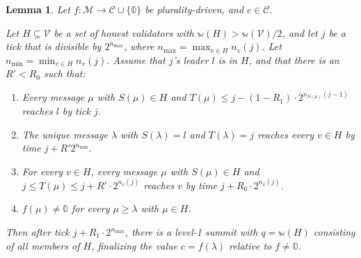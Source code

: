 \documentclass[12pt, fleqn]{article}
\newtheorem{lemma}{Lemma}
\newcommand{\ww}{\mathbb{w}}
\begin{document}
\begin{lemma}\label{basicLiveness}
  Let $f : \mathcal{M} \rightarrow \mathcal{C} \cup \{ \mathbb{0} \}$ be plurality-driven, and $c \in \mathcal{C}$.

  Let $H \subseteq \mathcal{V}$ be a set of honest validators with $\ww(H) > \ww(\mathcal{V}) / 2$, and let $j$ be a tick that is divisible by $2^{n_{\max}}$, where $n_{\max} = \max_{v \in H} n_v(j)$. Let $n_{\min} = \min_{v \in H} n_v(j)$. Assume that $j$'s leader $l$ is in $H$, and that there is an $R' < R_0$ such that:
  \begin{enumerate}
    \item Every message $\mu$ with $S(\mu) \in H$ and $T(\mu) \leq j - (1 - R_1) \cdot 2^{n_{S(\mu)}(j - 1)}$ reaches $l$ by tick $j$.
    \item The unique message $\lambda$ with $S(\lambda) = l$ and $T(\lambda) = j$ reaches every $v \in H$ by time $j + R' 2^{n_{\min}}$.
    \item For every $v \in H$, every message $\mu$ with $S(\mu) \in H$ and $j \leq T(\mu) \leq j + R' \cdot 2^{n_v(j)}$ reaches $v$ by time $j + R_0 \cdot 2^{n_v(j)}$.
    \item $f(\mu) \neq \mathbb{0}$ for every $\mu \geq \lambda$ with $\mu \in H$.
  \end{enumerate}
  Then after tick $j + R_1 \cdot 2^{n_{\max}}$, there is a level-1 summit with $q = \ww(H)$ consisting of all members of $H$, finalizing the value $c = f(\lambda)$ relative to $f \neq \mathbb{0}$.
\end{lemma}
\end{document}
